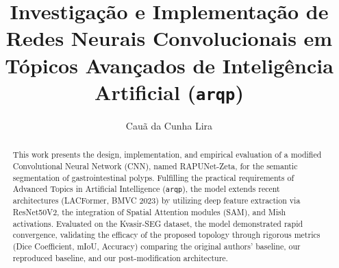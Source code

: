 \documentclass[runningheads]{llncs}
\begin{document}
\title{Investiga\c{c}\~{a}o e Implementa\c{c}\~{a}o de Redes Neurais Convolucionais em T\'{o}picos Avan\c{c}ados de Intelig\^{e}ncia Artificial (\texttt{arq\textperiodcentered p})}

\author{Cau\~{a} da Cunha Lira}


\maketitle

\begin{abstract}
This work presents the design, implementation, and empirical evaluation of a modified Convolutional Neural Network (CNN), named RAPUNet-Zeta, for the semantic segmentation of gastrointestinal polyps. Fulfilling the practical requirements of Advanced Topics in Artificial Intelligence (\texttt{arq\textperiodcentered p}), the model extends recent architectures (LACFormer, BMVC 2023) by utilizing deep feature extraction via ResNet50V2, the integration of Spatial Attention modules (SAM), and Mish activations. Evaluated on the Kvasir-SEG dataset, the model demonstrated rapid convergence, validating the efficacy of the proposed topology through rigorous metrics (Dice Coefficient, mIoU, Accuracy) comparing the original authors' baseline, our reproduced baseline, and our post-modification architecture.

\end{abstract}









\end{document}
